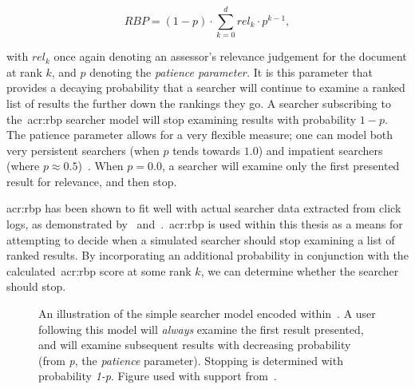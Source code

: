 \begin{equation}
RBP = (1 - p) \cdot \sum_{k=0}^{d}rel_k \cdot p^{k-1},
\end{equation}

with $rel_k$ once again denoting an assessor's relevance judgement for the document at rank $k$, and $p$ denoting the \emph{patience parameter.} It is this parameter that provides a decaying probability that a searcher will continue to examine a ranked list of results the further down the rankings they go. A searcher subscribing to the~\gls{acr:rbp} searcher model will stop examining results with probability $1-p$. The patience parameter allows for a very flexible measure; one can model both very persistent searchers (when $p$ tends towards $1.0$) and impatient searchers (where $p\approx0.5$)~\citep{moffat2008rbp}. When $p=0.0$, a searcher will examine only the first presented result for relevance, and then stop.

\gls{acr:rbp} has been shown to fit well with actual searcher data extracted from click logs, as demonstrated by~\cite{chapelle2009rbp} and~\cite{zhang2010click_rbp}.~\gls{acr:rbp} is used within this thesis as a means for attempting to decide when a simulated searcher should stop examining a list of ranked results. By incorporating an additional probability in conjunction with the calculated~\gls{acr:rbp} score at some rank $k$, we can determine whether the searcher should stop.

\begin{figure}[t!]
    \centering
    \caption[Flowchart depicting the searcher model encoded within~\gls{acr:rbp}]{An illustration of the simple searcher model encoded within~. A user following this model will \emph{always} examine the first result presented, and will examine subsequent results with decreasing probability (from \emph{p}, the \emph{patience} parameter). Stopping is determined with probability \emph{1-p}. Figure used with support from~\cite{moffat2008rbp}.}
    \label{fig:rbp}
\end{figure}

